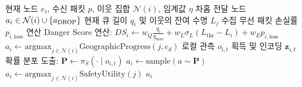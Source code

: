 \begin{algorithm}
\caption{\method{} 분산형 패킷 포워딩 의사결정 알고리즘}
\label{alg:risk_switch_kci}
\begin{algorithmic}[1]
\Require 현재 노드 $e_i$, 수신 패킷 $p$, 이웃 집합 $\mathcal{N}(i)$, 임계값 $\eta$
\Ensure 차홉 전달 노드 $a_i \in \mathcal{N}(i) \cup \{a_{\mathrm{DROP}}\}$
\State 현재 큐 길이 $q_i$ 및 이웃의 잔여 수명 $L_j$ 수집
\State 무선 패킷 손실률 $p_{i,\mathrm{loss}}$ 연산
\State Danger Score 연산: $DS_i \leftarrow w_Q \frac{q_i}{q_{\mathrm{max}}} + w_L \sigma_L(L_{\mathrm{thr}} - L_i) + w_E p_{i,\mathrm{loss}}$
 
    \State $a_i \leftarrow \mathrm{argmax}_{j \in \mathcal{N}(i)} \mathrm{GeographicProgress}(j, e_d)$
\Else {}
    \State 로컬 관측 $o_{i,t}$ 획득 및 인코딩 $\mathbf{z}_{i,t}$
    \State 확률 분포 도출: $\mathbf{P} \leftarrow \pi_S(\cdot \mid o_{i,t})$
    \State $a_i \leftarrow \mathrm{sample}(a \sim \mathbf{P})$
     
        \State $a_i \leftarrow \mathrm{argmax}_{j \in \mathcal{N}(i)} \mathrm{SafetyUtility}(j)$ 
    \EndIf
\EndIf
\State \Return $a_i$
\end{algorithmic}
\end{algorithm}
